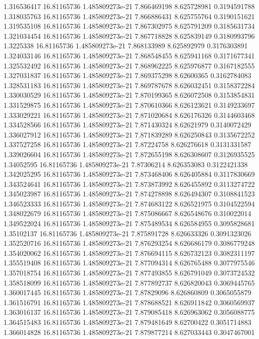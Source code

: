 {1.316536417 16.81165736 1.485809273e-21 7.866469198 8.625728981 0.3194591788
1.318035763 16.81165736 1.485809273e-21 7.866886431 8.625755764 0.3190151621
1.319535108 16.81165736 1.485809273e-21 7.867302975 8.625791209 0.3185631734
1.321034454 16.81165736 1.485809273e-21 7.867718828 8.625839149 0.3180993796
1.3225338 16.81165736 1.485809273e-21 7.868133989 8.625892979 0.3176303891
1.324033146 16.81165736 1.485809273e-21 7.868548455 8.625941168 0.3171677341
1.325532492 16.81165736 1.485809273e-21 7.868962225 8.625976877 0.3167182555
1.327031837 16.81165736 1.485809273e-21 7.869375298 8.62600365 0.3162784083
1.328531183 16.81165736 1.485809273e-21 7.869787678 8.626032451 0.3158372284
1.330030529 16.81165736 1.485809273e-21 7.870199365 8.626072508 0.3153854831
1.331529875 16.81165736 1.485809273e-21 7.870610366 8.626123621 0.3149233697
1.333029221 16.81165736 1.485809273e-21 7.871020684 8.626176326 0.3144603468
1.334528566 16.81165736 1.485809273e-21 7.871430324 8.62621979 0.3140072429
1.336027912 16.81165736 1.485809273e-21 7.871839289 8.626250843 0.3135672252
1.337527258 16.81165736 1.485809273e-21 7.87224758 8.626276618 0.3131331587
1.339026604 16.81165736 1.485809273e-21 7.872655198 8.626308607 0.3126935525
1.34052595 16.81165736 1.485809273e-21 7.87306214 8.626353083 0.3122421338
1.342025295 16.81165736 1.485809273e-21 7.873468406 8.626405884 0.3117830669
1.343524641 16.81165736 1.485809273e-21 7.873873992 8.626455892 0.3113274722
1.345023987 16.81165736 1.485809273e-21 7.874278898 8.626494307 0.3108841523
1.346523333 16.81165736 1.485809273e-21 7.874683122 8.626521975 0.3104522594
1.348022679 16.81165736 1.485809273e-21 7.875086667 8.626548676 0.310022014
1.349522024 16.81165736 1.485809273e-21 7.875489534 8.626584955 0.3095828681
1.35102137 16.81165736 1.485809273e-21 7.875891728 8.626633326 0.3091323026
1.352520716 16.81165736 1.485809273e-21 7.876293254 8.626686179 0.3086779248
1.354020062 16.81165736 1.485809273e-21 7.876694115 8.626732123 0.3082311197
1.355519408 16.81165736 1.485809273e-21 7.877094314 8.626765488 0.3077975546
1.357018754 16.81165736 1.485809273e-21 7.877493855 8.626791049 0.3073724532
1.358518099 16.81165736 1.485809273e-21 7.877892737 8.626820043 0.3069445765
1.360017445 16.81165736 1.485809273e-21 7.87829096 8.626860809 0.3065055879
1.361516791 16.81165736 1.485809273e-21 7.878688521 8.626911842 0.3060569937
1.363016137 16.81165736 1.485809273e-21 7.879085418 8.626963062 0.3056088775
1.364515483 16.81165736 1.485809273e-21 7.879481649 8.62700422 0.3051714883
1.366014828 16.81165736 1.485809273e-21 7.879877214 8.627033443 0.3047467001
}

